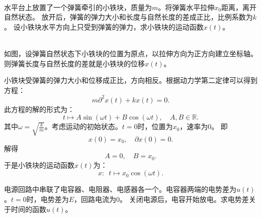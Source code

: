 \documentclass[12pt,UTF8]{ctexbook}
\begin{document}
\begin{et}
    \mbox{} \\水平台上放置了一个弹簧牵引的小铁块，质量为$m$。将弹簧水平拉伸$x_0$距离，离开自然状态。
    放开后，弹簧的弹力大小和长度与自然长度的差成正比，比例系数为$k$。
    设小铁块水平方向上只受到弹簧的弹力，求小铁块的运动函数$x(t)$。%
\end{et}

\begin{so}
    \mbox{} \\
    如图，设弹簧自然状态下小铁块的位置为原点，以拉伸方向为正方向建立坐标轴。
    则弹簧长度与自然长度的差就是小铁块的位移$x(t)$。

    小铁块受弹簧的弹力大小和位移成正比，方向相反。根据动力学第二定律可以得到方程：
    $$ m\partial^2 x(t) + kx(t) = 0. $$
    此方程的解的形式为：
    $$t \mapsto A\sin{(\omega t)} + B\cos{(\omega t)}, \quad  A, B \in \mathbb{R}.$$
    其中$\omega = \sqrt{\frac{k}{m}}$。考虑运动的初始状态。$t=0$时，位置为$x_0$，速率为$0$。
    即
    $$ x(0) = x_0,\quad \partial x(0) = 0.$$
    解得
    $$ A = 0, \quad B = x_0. $$
    于是小铁块的运动函数$x(t)$为：
    $$x:\,\,\, t \mapsto x_0\cos{(\omega t)}.$$
\end{so}

\begin{et}
    电源回路中串联了电容器、电阻器、电感器各一个。电容器两端的电势差为$u(t)$。$t=0$时，电势差为$E$，回路电流为$0$。
    关闭电源后，电容开始放电。求电势差关于时间的函数$u(t)$。
\end{et}
\end{document}
